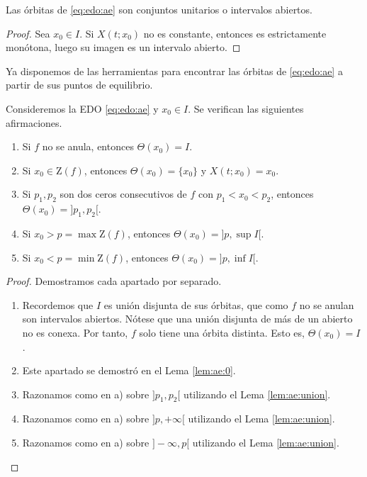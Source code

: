 \documentclass{article}
\begin{document}
\begin{corollary}
  Las órbitas de \eqref{eq:edo:ae} son conjuntos unitarios o intervalos abiertos.
\end{corollary}
\begin{proof}
  Sea $x_0 \in I$. Si $X(t;x_0)$ no es constante, entonces es estrictamente monótona, luego su
  imagen es un intervalo abierto.
\end{proof}

Ya disponemos de las herramientas para encontrar las órbitas de \eqref{eq:edo:ae} a partir de sus
puntos de equilibrio.

\begin{prop} \label{prop:ae:intervalos} Consideremos la EDO \eqref{eq:edo:ae} y $x_0 \in I$. Se
  verifican las siguientes afirmaciones.
  \begin{enumerate}
  \item Si $f$ no se anula, entonces $\Theta(x_0) = I$.
  \item Si $x_0 \in \mathrm{Z}(f)$, entonces $\Theta(x_0) = \{x_0\}$ y $X(t; x_0) = x_0$.
  \item Si $p_1, p_2$ son dos ceros consecutivos de $f$ con $p_1 < x_0 < p_2$, entonces
    $\Theta(x_0) = ]p_1, p_2[$.
  \item Si $x_0 > p = \max \mathrm{Z}(f)$, entonces $\Theta(x_0) = ]p, \sup I[$.
  \item Si $x_0 < p = \min \mathrm{Z}(f)$, entonces $\Theta(x_0) = ]p, \inf I[$.
  \end{enumerate}
\end{prop}
\begin{proof}
  Demostramos cada apartado por separado.
  
  \begin{enumerate}
  \item Recordemos que $I$ es unión disjunta de sus órbitas, que como $f$ no se anulan son
    intervalos abiertos. Nótese que una unión disjunta de más de un abierto no es conexa. Por tanto,
    $f$ solo tiene una órbita distinta. Esto es, $\Theta(x_0) = I$.
  \item Este apartado se demostró en el Lema \ref{lem:ae:0}.
  \item Razonamos como en a) sobre $]p_1, p_2[$ utilizando el Lema \ref{lem:ae:union}.
  \item Razonamos como en a) sobre $]p, +\infty[$ utilizando el Lema \ref{lem:ae:union}.
  \item Razonamos como en a) sobre $]-\infty, p[$ utilizando el Lema \ref{lem:ae:union}. \qedhere
  \end{enumerate}
\end{proof}
\end{document}
